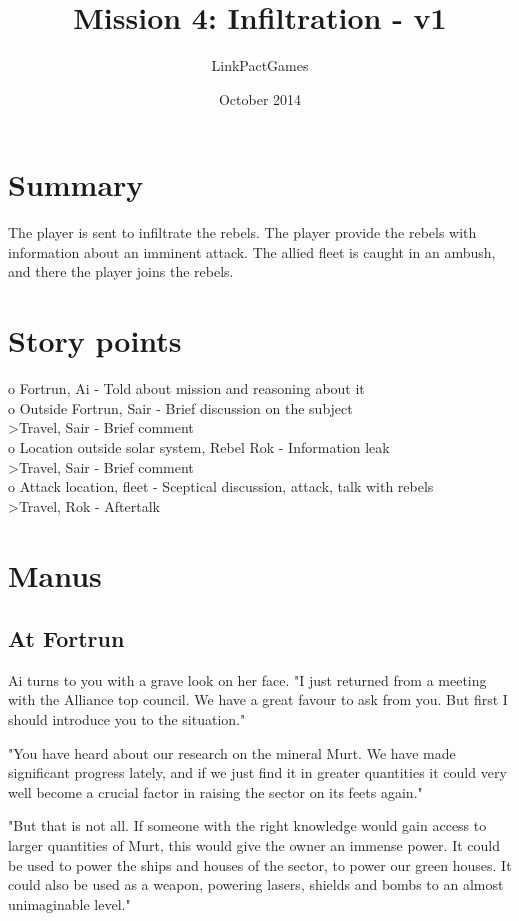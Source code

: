 \documentclass[a4paper,12pt]{article}
\begin{document}
\title{Mission 4: Infiltration - v1}
\author{LinkPactGames}
\date{October 2014}
\maketitle

\section{Summary}

The player is sent to infiltrate the rebels. The player provide
the rebels with information about an imminent attack. The allied
fleet is caught in an ambush, and there the player joins the rebels.

\section{Story points}

o Fortrun, Ai - Told about mission and reasoning about it\\
o Outside Fortrun, Sair - Brief discussion on the subject\\
\textgreater Travel, Sair - Brief comment\\
o Location outside solar system, Rebel Rok - Information leak\\
\textgreater Travel, Sair - Brief comment\\
o Attack location, fleet - Sceptical discussion, attack, talk with rebels\\
\textgreater Travel, Rok - Aftertalk

\section{Manus}

\subsection{At Fortrun}

Ai turns to you with a grave look on her face.
"I just returned from a meeting with the Alliance top council.
We have a great favour to ask from you. But first I should introduce you
to the situation."

"You have heard about our research on the mineral Murt. We have made significant
progress lately, and if we just find it in greater quantities it could very well
become a crucial factor in raising the sector on its feets again."

"But that is not all. If someone with the right knowledge would gain access to
larger quantities of Murt, this would give the owner an immense power. It could
be used to power the ships and houses of the sector, to power our green houses.
It could also be used as a weapon, powering lasers, shields and bombs to an
almost unimaginable level."
\end{document}
